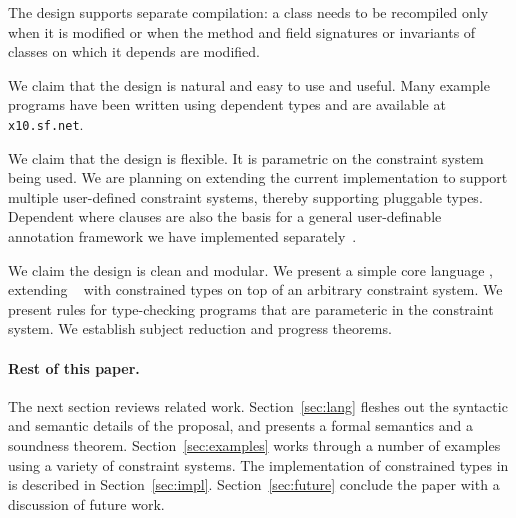 The design supports separate compilation: a class needs to be
recompiled only when it is modified or when the method
and field signatures or invariants of classes on which it
depends are modified.

We claim that the design is natural and easy to use and useful. Many
example programs have been written using dependent types and are
available at {\tt x10.sf.net}.

We claim that the design is flexible. It is parametric on the
constraint system being used. We are planning on extending the current
implementation to support multiple user-defined constraint systems,
thereby supporting pluggable types. Dependent where clauses are also
the basis for a general user-definable annotation framework we have
implemented separately~\cite{ns07-x10anno}. 

We claim the design is clean and modular. We present a simple core
language \CFJ, extending \FJ{}~\cite{FJ} with constrained types on top
of an arbitrary constraint system. We present rules for type-checking
\CFJ{} programs that are parameteric in the constraint system. 
We establish subject reduction and progress theorems. 

%

\paragraph{Rest of this paper.}

The next section reviews related work.
Section~\ref{sec:lang} fleshes out the syntactic and semantic details of the
proposal, and presents a formal semantics
and a soundness theorem.
Section~\ref{sec:examples} works through a number of
examples using a variety of constraint systems.
The implementation of constrained types in \Xten{} is described
in Section~\ref{sec:impl}.
Section~\ref{sec:future}
conclude the paper with a discussion of
future work.

